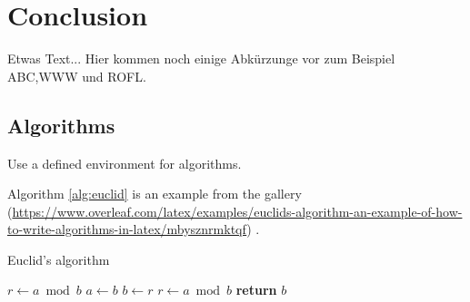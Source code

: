 \documentclass[Master,MDS,english]{BASE/twbook} %
\begin{document}
\chapter{Conclusion} %





Etwas Text... Hier kommen noch einige Abkürzunge vor zum Beispiel \ac{ABC},\ac{WWW} und \ac{ROFL}.


\section{Algorithms}


Use a defined environment for algorithms.

Algorithm \ref{alg:euclid} is an example from the gallery (\url{https://www.overleaf.com/latex/examples/euclids-algorithm-an-example-of-how-to-write-algorithms-in-latex/mbysznrmktqf}) .
\begin{algorithm}
\caption{Euclid’s algorithm}\label{alg:euclid}
\begin{algorithmic}[1]
\State $r\gets a\bmod b$
\State $a\gets b$
\State $b\gets r$
\State $r\gets a\bmod b$
\EndWhile\label{euclidendwhile}
\State \textbf{return} $b$
\EndProcedure
\end{algorithmic}
\end{algorithm}
\clearpage                                                       %


\clearpage

\listoffigures                                                   %
\clearpage

\listoftables                                                    %
\clearpage

\listoflistings                                                  %
\clearpage
\end{document}
